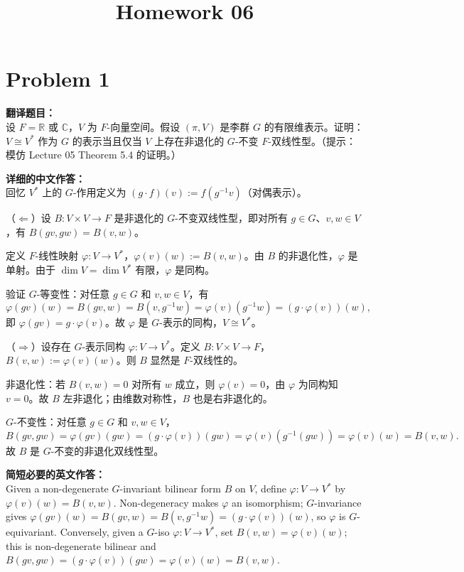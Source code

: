 \documentclass{ctexart}
\begin{document}
\title{Homework 06}
\author{}
\date{}
\maketitle

\section*{Problem 1}
\textbf{翻译题目：}\\
设 $F = \mathbb{R}$ 或 $\mathbb{C}$，$V$ 为 $F$-向量空间。假设 $(\pi, V)$ 是李群 $G$ 的有限维表示。证明：$V \cong V^{*}$ 作为 $G$ 的表示当且仅当 $V$ 上存在非退化的 $G$-不变 $F$-双线性型。（提示：模仿 Lecture 05 Theorem 5.4 的证明。）

\vspace{1em}
\textbf{详细的中文作答：}\\
回忆 $V^{*}$ 上的 $G$-作用定义为 $(g \cdot f)(v) := f(g^{-1}v)$（对偶表示）。

（$\Leftarrow$）设 $B: V \times V \to F$ 是非退化的 $G$-不变双线性型，即对所有 $g \in G$、$v, w \in V$，有 $B(gv, gw) = B(v, w)$。

定义 $F$-线性映射 $\varphi: V \to V^{*}$，$\varphi(v)(w) := B(v, w)$。由 $B$ 的非退化性，$\varphi$ 是单射。由于 $\dim V = \dim V^{*}$ 有限，$\varphi$ 是同构。

验证 $G$-等变性：对任意 $g \in G$ 和 $v, w \in V$，有
\[
\varphi(gv)(w) = B(gv, w) = B(v, g^{-1}w) = \varphi(v)(g^{-1}w) = (g \cdot \varphi(v))(w),
\]
即 $\varphi(gv) = g \cdot \varphi(v)$。故 $\varphi$ 是 $G$-表示的同构，$V \cong V^{*}$。

（$\Rightarrow$）设存在 $G$-表示同构 $\varphi: V \to V^{*}$。定义 $B: V \times V \to F$，$B(v, w) := \varphi(v)(w)$。则 $B$ 显然是 $F$-双线性的。

非退化性：若 $B(v, w) = 0$ 对所有 $w$ 成立，则 $\varphi(v) = 0$，由 $\varphi$ 为同构知 $v = 0$。故 $B$ 左非退化；由维数对称性，$B$ 也是右非退化的。

$G$-不变性：对任意 $g \in G$ 和 $v, w \in V$，
\[
B(gv, gw) = \varphi(gv)(gw) = (g \cdot \varphi(v))(gw) = \varphi(v)(g^{-1}(gw)) = \varphi(v)(w) = B(v, w).
\]
故 $B$ 是 $G$-不变的非退化双线性型。

\vspace{1em}
\textbf{简短必要的英文作答：}\\
Given a non-degenerate $G$-invariant bilinear form $B$ on $V$, define $\varphi: V \to V^{*}$ by $\varphi(v)(w) = B(v,w)$. Non-degeneracy makes $\varphi$ an isomorphism; $G$-invariance gives $\varphi(gv)(w) = B(gv, w) = B(v, g^{-1}w) = (g\cdot\varphi(v))(w)$, so $\varphi$ is $G$-equivariant. Conversely, given a $G$-iso $\varphi: V \to V^{*}$, set $B(v,w) = \varphi(v)(w)$; this is non-degenerate bilinear and $B(gv, gw) = (g\cdot\varphi(v))(gw) = \varphi(v)(w) = B(v,w)$.
\end{document}
